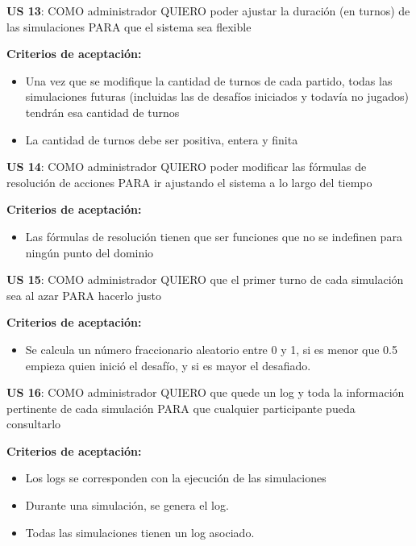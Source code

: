 \begin{tcolorbox}
\textbf{US 13}: COMO administrador QUIERO poder ajustar la duración (en turnos) de las simulaciones PARA que el sistema sea flexible

\vline

\textbf{Criterios de aceptación:}
\begin{itemize}
\item Una vez que se modifique la cantidad de turnos de cada partido, todas las simulaciones futuras (incluidas las de desafíos iniciados y todavía no jugados) tendrán esa cantidad de turnos
\item La cantidad de turnos debe ser positiva, entera y finita
\end{itemize}
\end{tcolorbox}
\vspace{10pt}

\begin{tcolorbox}
\textbf{US 14}: COMO administrador QUIERO poder modificar las fórmulas de resolución de acciones PARA ir ajustando el sistema a lo largo del tiempo

\vline

\textbf{Criterios de aceptación:}
\begin{itemize}
\item Las fórmulas de resolución tienen que ser funciones que no se indefinen para ningún punto del dominio
\end{itemize}
\end{tcolorbox}
\vspace{10pt}


\begin{tcolorbox}
\textbf{US 15}: COMO administrador QUIERO que el primer turno de cada simulación sea al azar PARA hacerlo justo

\vline

\textbf{Criterios de aceptación:}
\begin{itemize}
\item Se calcula un número fraccionario aleatorio entre 0 y 1, si es menor que 0.5 empieza quien inició el desafío, y si es mayor el desafiado.
\end{itemize}
\end{tcolorbox}
\vspace{10pt}

\begin{tcolorbox}
\textbf{US 16}: COMO administrador QUIERO que quede un log y toda la información pertinente de cada simulación PARA que cualquier participante pueda consultarlo

\vline

\textbf{Criterios de aceptación:}
\begin{itemize}
\item Los logs se corresponden con la ejecución de las simulaciones
\item Durante una simulación, se genera el log.
\item Todas las simulaciones tienen un log asociado.
\end{itemize}
\end{tcolorbox}
\vspace{10pt}

